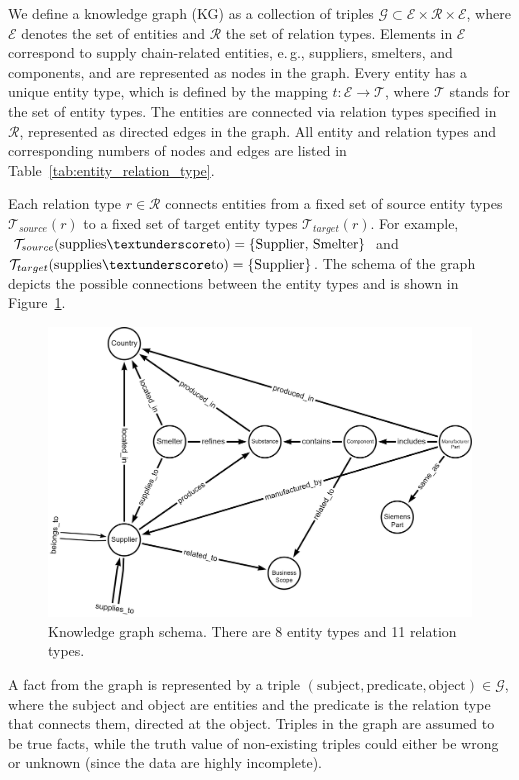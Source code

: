 \documentclass[
]{ceurart}
\begin{document}
We define a knowledge graph (KG) as a collection of triples $\mathcal{G} \subset \mathcal{E} \times \mathcal{R} \times \mathcal{E} $, where $\mathcal{E}$ denotes the set of entities and $\mathcal{R}$ the set of relation types. 
 Elements in $\mathcal{E}$ correspond to supply chain-related entities, e.\,g., suppliers, smelters, and components, and are represented as nodes in the graph. Every entity has a unique entity type, which is defined by the mapping $t: \mathcal{E} \rightarrow \mathcal{T}$, where $\mathcal{T}$ stands for the set of entity types.
The entities are connected via relation types specified in $\mathcal{R}$, represented as directed edges in the graph. All entity and relation types and corresponding numbers of nodes and edges are listed in Table~\ref{tab:entity_relation_type}.

Each relation type $r \in \mathcal{R}$ connects entities from a fixed set of source entity types $\mathcal{T}_{source}(r)$ to a fixed set of target entity types $\mathcal{T}_{target}(r)$. For example, $\mathcal{T}_{source}(\mathrm{supplies\textunderscore to}) = \{\mathrm{Supplier},\, \mathrm{Smelter}\}$ and $\mathcal{T}_{target}(\mathrm{supplies\textunderscore to}) = \{\mathrm{Supplier}\}$. The schema of the graph depicts the possible connections between the entity types and is shown in Figure~\ref{fig:schema}.
\begin{figure}
  \centering
  \includegraphics[width=0.84\linewidth]{figures/schema.png}
  \caption{Knowledge graph schema. There are 8 entity types and 11 relation types.}
  \label{fig:schema}
\end{figure}

A fact from the graph is represented by a triple $(\mathrm{subject}, \mathrm{predicate}, \mathrm{object}) \in \mathcal{G}$, where the subject and object are entities and the predicate is the relation type that connects them, directed at the object. Triples in the graph are assumed to be true facts, while the truth value of non-existing triples could either be wrong or unknown (since the data are highly incomplete).
\end{document}
